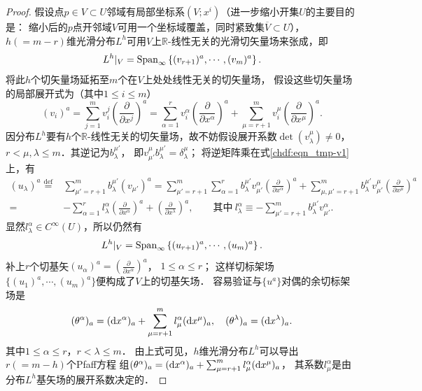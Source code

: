 \begin{proof}
假设点$p\in V\subset U$邻域有局部坐标系$(V;x^i)$（进一步缩小开集$U$的主要目的是：
缩小后的$p$点开邻域$V$可用一个坐标域覆盖，同时紧致集$\overline{V}\subset U$），
$h(=m-r)$维光滑分布$L^h$可用$V$上$\mathbb{R}$-线性无关的光滑切矢量场来张成，即
\begin{equation}
    L^h|_V = {\rm Span}_{\infty} \left\{(v_{r+1})^a,\cdots, (v_m)^a \right\}.
\end{equation}
将此$h$个切矢量场延拓至$m$个在$V$上处处线性无关的切矢量场，
假设这些切矢量场的局部展开式为（其中$1\leqslant i\leqslant m$）
\begin{equation}\label{chdf:eqn_tmp-v1}
    (v_i)^a= \sum_{j=1}^{m} v_i^j \left(\frac{\partial}{\partial x^j}\right)^a
    =\sum_{\alpha=1}^{r}v_i^\alpha \left(\frac{\partial}{\partial x^\alpha}\right)^a
    +\sum_{\mu=r+1}^{m}v_i^\mu \left(\frac{\partial}{\partial x^\mu}\right)^a .
\end{equation}
因分布$L^h$要有$h$个$\mathbb{R}$-线性无关的切矢量场，故不妨假设展开系数$\det(v_\lambda^\mu)\neq 0$，
$r< \mu,\lambda \leqslant m$．其逆记为$b_\lambda^{\mu'}$，
即$v^\mu_{\mu'} b_\lambda^{\mu'} =\delta^\mu_\lambda$；
将逆矩阵乘在式\eqref{chdf:eqn_tmp-v1}上，有
\begin{align*}
    (u_\lambda)^a \overset{\mathrm {def}}{=}&  \sum_{\mu'=r+1}^{m} b_\lambda^{\mu'} (v_{\mu'})^a
    =\sum_{\mu'=r+1}^{m} \sum_{\alpha=1}^{r} b_\lambda^{\mu'} v_{\mu'}^\alpha 
    \left(\frac{\partial}{\partial x^\alpha}\right)^a
    +\sum_{\mu,{\mu'}=r+1}^{m} b_\lambda^{\mu'} v_{\mu'}^\mu
        \left(\frac{\partial}{\partial x^\mu}\right)^a   \\
    =&-\sum_{\alpha=1}^{r} l_\lambda^{\alpha} \left(\frac{\partial}{\partial x^\alpha}\right)^a
    + \left(\frac{\partial}{\partial x^\lambda}\right)^a ,
    \qquad \text{其中}\ l_\lambda^{\alpha} 
   \equiv - \sum_{\mu'=r+1}^{m}b_\lambda^{\mu'} v_{\mu'}^\alpha .
\end{align*}
显然$l_\lambda^{\alpha} \in C^\infty(U)$，所以仍然有
\begin{equation}
    L^h|_V = {\rm Span}_{\infty} \left\{(u_{r+1})^a,\cdots, (u_m)^a \right\}.
\end{equation}
补上$r$个切基矢$(u_\alpha)^a= \left(\frac{\partial}{\partial x^\alpha}\right)^a$，
$1\leqslant \alpha \leqslant r$；
这样切标架场$\{ (u_{1})^a,\cdots, (u_m)^a \}$便构成了$V$上的切基矢场．
容易验证与$\{u^a\}$对偶的余切标架场是
\begin{equation}
    (\theta^\alpha)_a =  ({\rm d}x^\alpha)_a + \sum_{\mu=r+1}^{m} l^\alpha_\mu ({\rm d}x^\mu)_a  ,
    \quad   (\theta^\lambda)_a = ({\rm d}x^\lambda)_a.  
\end{equation}
其中$1 \leqslant \alpha \leqslant r$，$r<\lambda\leqslant m$．
由上式可见，$h$维光滑分布$L^h$可以导出$r(=m-h)$个Pfaff方程
组$(\theta^\alpha)_a =  ({\rm d}x^\alpha)_a + \sum_{\mu=r+1}^{m} l^\alpha_\mu ({\rm d}x^\mu)_a $，
其系数$l^\alpha_\mu$是由分布$L^h$基矢场的展开系数决定的．


\end{proof}
